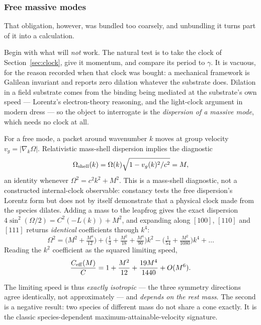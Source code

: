 \documentclass[11pt,a4paper]{article}
\theoremstyle{definition}
\theoremstyle{plain}
\theoremstyle{remark}
\begin{document}
\subsubsection{Free massive modes}
\label{sec:massivecone}

That obligation, however, was bundled too coarsely, and unbundling it
turns part of it into a calculation.

Begin with what will \emph{not} work. The natural test is to take the
clock of Section~\ref{sec:clock}, give it momentum, and compare its period
to $\gamma$. It is vacuous, for the reason recorded when that clock was
bought: a mechanical framework is Galilean invariant and reports zero
dilation whatever the substrate does. Dilation in a field substrate comes
from the binding being mediated at the substrate's own speed --- Lorentz's
electron-theory reasoning, and the light-clock argument in modern dress
--- so the object to interrogate is the \emph{dispersion of a massive
mode}, which needs no clock at all.

For a free mode, a packet around wavenumber $k$ moves at group velocity
$v_g = |\nabla_k\Omega|$. Relativistic mass-shell dispersion implies the
diagnostic
\begin{equation}
\Omega_{\rm shell}(k) = \Omega(k)\sqrt{1 - v_g(k)^2/c^2} = M,
\label{eq:properfreq}
\end{equation}
an identity whenever $\Omega^2 = c^2k^2 + M^2$. This is a mass-shell
diagnostic, not a constructed internal-clock observable: constancy tests
the free dispersion's Lorentz form but does not by itself demonstrate that
a physical clock made from the species dilates. Adding a mass to the
leapfrog gives the exact dispersion
$4\sin^2(\Omega/2) = C^2(-L(k)) + M^2$, and expanding along $[100]$,
$[110]$ and $[111]$ returns \emph{identical} coefficients through $k^4$:
\[
\Omega^2 = \Big(M^2 + \tfrac{M^4}{12}\Big)
+ \Big(\tfrac13 + \tfrac{M^2}{18} + \tfrac{M^4}{90}\Big)k^2
- \Big(\tfrac1{54} + \tfrac{M^2}{1080}\Big)k^4 + \dots
\]
Reading the $k^2$ coefficient as the squared limiting speed,
\begin{equation}
\frac{C_{\rm eff}(M)}{C} = 1 + \frac{M^2}{12} + \frac{19M^4}{1440}
+ O(M^6).
\label{eq:ceff}
\end{equation}

The limiting speed is thus \emph{exactly isotropic} --- the three symmetry
directions agree identically, not approximately --- and \emph{depends on
the rest mass}. The second is a negative result: two species of different
mass do not share a cone exactly. It is the classic species-dependent
maximum-attainable-velocity signature.
\end{document}
